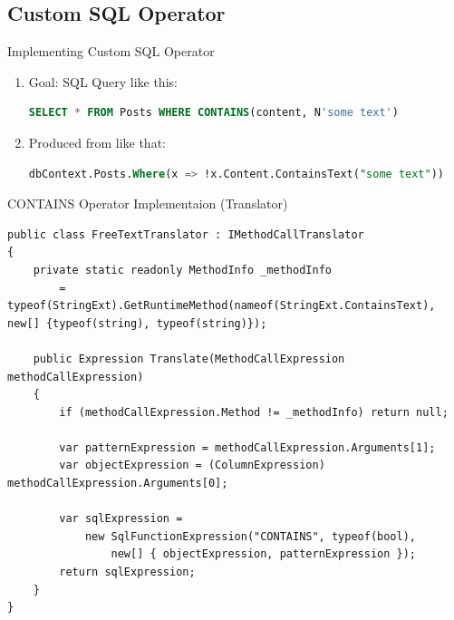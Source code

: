 \documentclass{bredelebeamer}
\begin{document}
\subsection{Custom SQL Operator}
\begin{frame}[fragile]{Implementing Custom SQL Operator}
    \begin{enumerate}[<+->]
        \item {
            Goal: SQL Query like this:
            \begin{lstlisting}[language=SQL]
    SELECT * FROM Posts WHERE CONTAINS(content, N'some text')
            \end{lstlisting}
        }
        \item {
            Produced from like that:
            \begin{lstlisting}[language=SQL]
    dbContext.Posts.Where(x => !x.Content.ContainsText("some text"))
            \end{lstlisting}
        }
    \end{enumerate}
\end{frame}
\begin{frame}[fragile]{CONTAINS Operator Implementaion (Translator)}
    \begin{lstlisting}
public class FreeTextTranslator : IMethodCallTranslator
{
    private static readonly MethodInfo _methodInfo
        = typeof(StringExt).GetRuntimeMethod(nameof(StringExt.ContainsText), new[] {typeof(string), typeof(string)});

    public Expression Translate(MethodCallExpression methodCallExpression)
    {
        if (methodCallExpression.Method != _methodInfo) return null;

        var patternExpression = methodCallExpression.Arguments[1];
        var objectExpression = (ColumnExpression) methodCallExpression.Arguments[0];

        var sqlExpression =
            new SqlFunctionExpression("CONTAINS", typeof(bool),
                new[] { objectExpression, patternExpression });
        return sqlExpression;
    }
}
    \end{lstlisting}
\end{frame}
\end{document}
